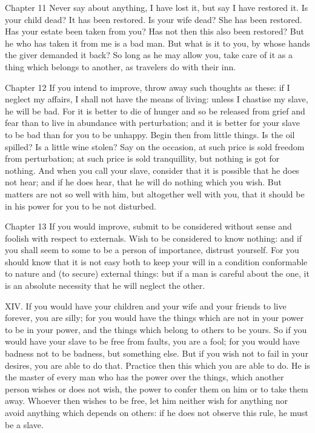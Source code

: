 Chapter 11 Never say about anything, I have lost it, but say I have restored it. Is your child dead? It has been restored. Is your wife dead? She has been restored. Has your estate been taken from you? Has not then this also been restored? But he who has taken it from me is a bad man. But what is it to you, by whose hands the giver demanded it back? So long as he may allow you, take care of it as a thing which belongs to another, as travelers do with their inn.



Chapter 12 If you intend to improve, throw away such thoughts as these: if I neglect my affairs, I shall not have the means of living: unless I chastise my slave, he will be bad. For it is better to die of hunger and so be released from grief and fear than to live in abundance with perturbation; and it is better for your slave to be bad than for you to be unhappy. Begin then from little things. Is the oil spilled? Is a little wine stolen? Say on the occasion, at such price is sold freedom from perturbation; at such price is sold tranquillity, but nothing is got for nothing. And when you call your slave, consider that it is possible that he does not hear; and if he does hear, that he will do nothing which you wish. But matters are not so well with him, but altogether well with you, that it should be in his power for you to be not disturbed.



Chapter 13 If you would improve, submit to be considered without sense and foolish with respect to externals. Wish to be considered to know nothing: and if you shall seem to some to be a person of importance, distrust yourself. For you should know that it is not easy both to keep your will in a condition conformable to nature and (to secure) external things: but if a man is careful about the one, it is an absolute necessity that he will neglect the other.



XIV. If you would have your children and your wife and your friends to live forever, you are silly; for you would have the things which are not in your power to be in your power, and the things which belong to others to be yours. So if you would have your slave to be free from faults, you are a fool; for you would have badness not to be badness, but something else. But if you wish not to fail in your desires, you are able to do that. Practice then this which you are able to do. He is the master of every man who has the power over the things, which another person wishes or does not wish, the power to confer them on him or to take them away. Whoever then wishes to be free, let him neither wish for anything nor avoid anything which depends on others: if he does not observe this rule, he must be a slave.



